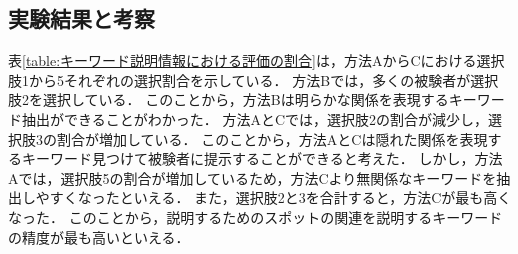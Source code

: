 \documentclass{deimj}
\begin{document}
\subsection{実験結果と考察}
%

表\ref{table:キーワード説明情報における評価の割合}は，方法AからCにおける選択肢1から5それぞれの選択割合を示している．
方法Bでは，多くの被験者が選択肢2を選択している．
このことから，方法Bは明らかな関係を表現するキーワード抽出ができることがわかった．
方法AとCでは，選択肢2の割合が減少し，選択肢3の割合が増加している．
このことから，方法AとCは隠れた関係を表現するキーワード見つけて被験者に提示することができると考えた．
しかし，方法Aでは，選択肢5の割合が増加しているため，方法Cより無関係なキーワードを抽出しやすくなったといえる．
また，選択肢2と3を合計すると，方法Cが最も高くなった．
このことから，説明するためのスポットの関連を説明するキーワードの精度が最も高いといえる．


\end{document}
